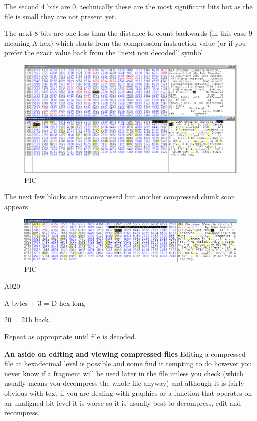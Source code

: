 \documentclass[
]{book}
\begin{document}
The second 4 bits are 0, technically these are the most significant bits but as the file is small they are not present yet.

The next 8 bits are one less than the distance to count backwards (in this case 9 meaning A hex) which starts from the compression instruction value (or if you prefer the exact value back from the ``next non decoded'' symbol.

\begin{figure}
\centering
\includegraphics{images/192_home_fast6191_romhackingguide_unrenamed_fil___omhackingguidecompressionsLZworkedexample_2.png}
\caption{PIC}
\end{figure}

The next few blocks are uncompressed but another compressed chunk soon appears

\begin{figure}
\centering
\includegraphics{images/193_home_fast6191_romhackingguide_unrenamed_fil___omhackingguidecompressionsLZworkedexample_3.png}
\caption{PIC}
\end{figure}

A020

A bytes + 3 = D hex long

20 = 21h back.

Repeat as appropriate until file is decoded.

\textbf{An aside on editing and viewing compressed files} Editing a compressed file at hexadecimal level is possible and some find it tempting to do however you never know if a fragment will be used later in the file unless you check (which usually means you decompress the whole file anyway) and although it is fairly obvious with text if you are dealing with graphics or a function that operates on an unaligned bit level it is worse so it is usually best to decompress, edit and recompress.
\end{document}

